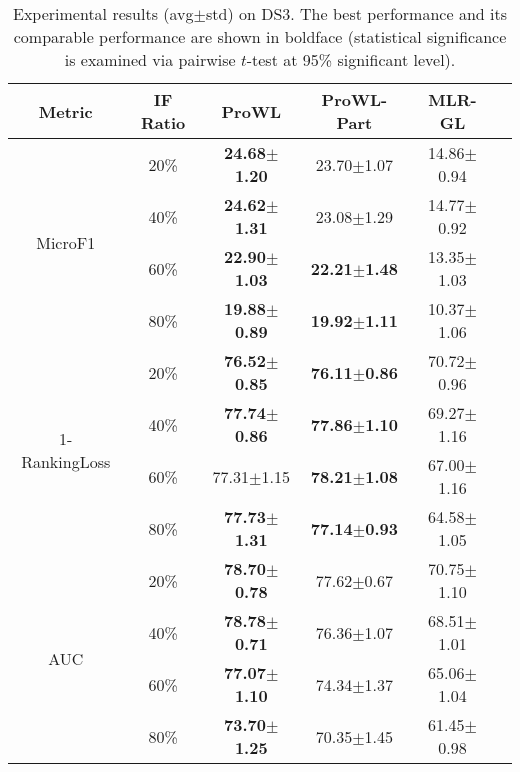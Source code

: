\documentclass{llncs} %
\begin{document}
\begin{table*}[h!]
\scriptsize
\caption{Experimental results (avg$\pm$std) on DS3. The best performance and its comparable performance are shown in boldface (statistical significance is examined via pairwise $t$-test at 95\% significant level).}
\centering
\begin{tabular}{|c| c| c| c| c| c|}
\hline
Metric &IF Ratio &ProWL &ProWL-Part &MLR-GL\\
\hline
\multirow{4}{*}{MicroF1}
& 20\% &\bf 24.68$\pm$1.20 &23.70$\pm$1.07 &14.86$\pm$0.94\\
& 40\% &\bf 24.62$\pm$1.31 &23.08$\pm$1.29 &14.77$\pm$0.92\\
& 60\% &\bf 22.90$\pm$1.03 &\bf 22.21$\pm$1.48 &13.35$\pm$1.03\\
& 80\% &\bf 19.88$\pm$0.89 &\bf 19.92$\pm$1.11 &10.37$\pm$1.06\\
\hline
\multirow{4}{*}{1-RankingLoss}
& 20\% &\bf 76.52$\pm$0.85 &\bf 76.11$\pm$0.86 &70.72$\pm$0.96\\
& 40\% &\bf 77.74$\pm$0.86 &\bf 77.86$\pm$1.10 &69.27$\pm$1.16\\
& 60\% &    77.31$\pm$1.15 &\bf 78.21$\pm$1.08 &67.00$\pm$1.16\\
& 80\% &\bf 77.73$\pm$1.31 &\bf 77.14$\pm$0.93 &64.58$\pm$1.05\\
\hline
\multirow{4}{*}{AUC}
& 20\% &\bf 78.70$\pm$0.78 &77.62$\pm$0.67 &70.75$\pm$1.10\\
& 40\% &\bf 78.78$\pm$0.71 &76.36$\pm$1.07 &68.51$\pm$1.01\\
& 60\% &\bf 77.07$\pm$1.10 &74.34$\pm$1.37 &65.06$\pm$1.04\\
& 80\% &\bf 73.70$\pm$1.25 &70.35$\pm$1.45 &61.45$\pm$0.98\\
\hline
\end{tabular}
\label{Table4}
\end{table*}
\end{document}
